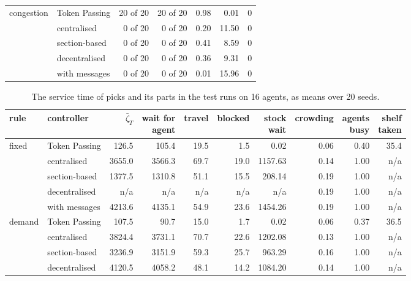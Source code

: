 \documentclass[11pt,a4paper]{article}
\newcommand{\new}[1]{\textcolor{newc}{#1}}
\begin{document}
\begin{table}[h]
\begin{tabular}{llrrrrr}
    congestion & Token Passing  & 20 of 20 & 20 of 20 & 0.98 & 0.01 & 0 \\
               & centralised    & 0 of 20 & 0 of 20 & 0.20 & 11.50 & 0 \\
               & section-based  & 0 of 20 & 0 of 20 & 0.41 & 8.59 & 0 \\
               & decentralised  & 0 of 20 & 0 of 20 & 0.36 & 9.31 & 0 \\
               & with messages  & 0 of 20 & 0 of 20 & 0.01 & 15.96 & 0 \\
    \bottomrule
  \end{tabular}
\end{table}

\begin{table}[h]
  \centering
  \small
  \setlength{\tabcolsep}{4pt}
  \caption{\new{The service time of picks and its parts in the test runs on 16 agents, as means over 20 seeds.}}
  \label{tab:app:result:16}
  \begin{tabular}{llrrrrrrrr}
    \toprule
    rule  &  controller  &  $\bar\zeta_T$  &  \shortstack{wait for\\agent}  &  travel  &  blocked  &  \shortstack{stock\\wait}  &  crowding  &  \shortstack{agents\\busy}  &  \shortstack{shelf\\taken} \\
    \midrule
    fixed      & Token Passing  & 126.5 & 105.4 & 19.5 & 1.5 & 0.02 & 0.06 & 0.40 & 35.4 \\
               & centralised    & 3655.0 & 3566.3 & 69.7 & 19.0 & 1157.63 & 0.14 & 1.00 & n/a \\
               & section-based  & 1377.5 & 1310.8 & 51.1 & 15.5 & 208.14 & 0.19 & 1.00 & n/a \\
               & decentralised  & n/a & n/a & n/a & n/a & n/a & 0.19 & 1.00 & n/a \\
               & with messages  & 4213.6 & 4135.1 & 54.9 & 23.6 & 1454.26 & 0.19 & 1.00 & n/a \\
    demand     & Token Passing  & 107.5 & 90.7 & 15.0 & 1.7 & 0.02 & 0.06 & 0.37 & 36.5 \\
               & centralised    & 3824.4 & 3731.1 & 70.7 & 22.6 & 1202.08 & 0.13 & 1.00 & n/a \\
               & section-based  & 3236.9 & 3151.9 & 59.3 & 25.7 & 963.29 & 0.16 & 1.00 & n/a \\
               & decentralised  & 4120.5 & 4058.2 & 48.1 & 14.2 & 1084.20 & 0.14 & 1.00 & n/a \\

\end{tabular}
\end{table}
\end{document}
